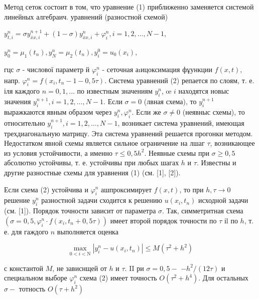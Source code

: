 \documentclass[10pt]{article}
\begin{document}
Метод сеток состоит в том, что уравнение (1) приближенно заменяется системой линейных алгебраич. уравнений (разностной схемой)



$y_{t, i}^{n}=\sigma y_{\bar{x} x, i}^{n+1}+(1-\sigma) y_{\bar{x} x, i}^{n}+\varphi_{i}^{n}, i=1,2, \ldots, N-1$,

$y_{0}^{n}=\mu_{1}\left(t_{n}\right), y_{N}^{n}=\mu_{2}\left(t_{n}\right), y_{i}^{0}=u_{0}\left(x_{i}\right)$,



гцс $\sigma$ - числової параметр й $\varphi_{i}^{n}$ - сеточная аıицоксимация фұункции $f(x, t)$, напр. $\varphi_{i}^{n}=f\left(x_{i}, t_{n}-1-0,5 \tau\right)$. Система уравнений (2) репается по слоям, т. е. іля каждого $n=0,1, \ldots$ по известным значениям $y_{i}^{n}$, œ $i$ находятся новыс значения $y_{i}^{n+1}, i=1,2, \ldots, N-1$. Если $\sigma=0$ (лвная схема), то $y_{i}^{n+1}$ выражкаются явным образом через $y_{i}^{n}, \varphi_{i}^{n}$. Если же $\sigma \neq 0$ (неявныс схемы), то относительно $y_{i}^{n+1}, i=1,2, \ldots, N-1$, возникает система уравнений, имеющая трехдиагональную матрицу. Эта система уравнений решается прогонки методом. Недостатком явной схемы является сильное ограничение на лшаг $\tau$, возникающее из условия устойчивости, а именно $\tau \leqslant 0,5 h^{2}$. Неявные схемы при $\sigma \geqslant 0,5$ абсолютно устойчивы, т. е. устойчивы при любых шагах $h$ и $\tau$. Известны и другие разностные схемы для уравнения (1) (см. [1], [2]).



Если схема (2) устойчива и $\varphi_{i}^{n}$ ашпроксимирует $f(x, t)$, то при $h, \tau \rightarrow 0$ решение $y_{i}^{n}$ разностной задачи сходится к решению $u\left(x_{i}, t_{n}\right)$ исходной задачи (см. [1]). Порядок точности зависит от параметра $\sigma$. Так, симметритная схема $\left(\sigma=0,5, \varphi_{i}^{n} \cdot f\left(x_{i}, t_{n}+0,5 \tau\right)\right)$ имеет второй порядок точности по $\tau$ іl по $h$, т. е. для гаждого $n$ выполняется оценка



\[

\max _{0<i<\mathrm{N}}\left|y_{i}^{n}-u\left(x_{i}, t_{n}\right)\right| \leqslant M\left(\tau^{2}+h^{2}\right)

\]



с константой $M$, не зависнщей от $h$ и $\tau$. II ри $\sigma=0,5-$ $-h^{2} /(12 \tau)$ и специальном выборе $\varphi_{i}^{n}$ схема (2) имеет точность $O\left(\tau^{2}+h^{4}\right)$. Для остальных $\sigma-$ тотность $O\left(\tau+h^{2}\right)$
\end{document}
